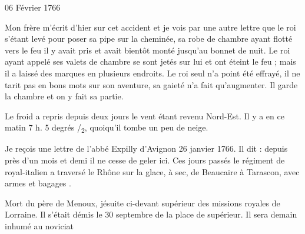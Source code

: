                      \begin{diary}{06 Février 1766}{}


                           Mon frère m'écrit d'hier sur cet accident
                           et je vois par une autre lettre que le roi s'étant
                           levé pour poser sa pipe sur la cheminée, sa
                           robe de chambre ayant flotté vers le feu il
                           y avait pris et avait bientôt monté jusqu'au
                           bonnet de nuit. Le roi
                           ayant
                           appelé ses
                           valets de chambre se sont jetés sur lui et
                           ont éteint le feu ; mais il a laissé des
                           marques en plusieurs endroits. Le
                              roi seul
                           n'a point été effrayé, il ne tarit pas en
                           bons mots sur son aventure, sa gaieté
                           n'a fait qu'augmenter. Il garde la chambre
                           et on y fait sa partie. \bigskip


                         Le froid a repris depuis deux jours le
                           vent étant revenu Nord-Est. Il y a
                           en ce matin 7
                              h.
                           5 degrés
                              /\textsubscript{2}, quoiqu'il tombe un peu de neige. \bigskip


                         Je reçois une lettre de l'abbé Expilly
                           d'Avignon
                           26 janvier 1766. Il dit :
                           \og depuis près d'un mois et demi il ne cesse
                              de geler ici. Ces jours passés le régiment
                                 de royal-italien a traversé le
                                 Rhône sur
                              la glace, à sec, de Beaucaire à Tarascon,
                              avec armes et bagages \fg{}. \bigskip


                         Mort du père de Menoux, jésuite ci-devant
                           supérieur des missions royales de Lorraine.
                           Il s'était démis le
                                 30 septembre de la place de supérieur.
                           Il sera demain inhumé au
                              noviciat
                        \bigskip


                     \end{diary}

